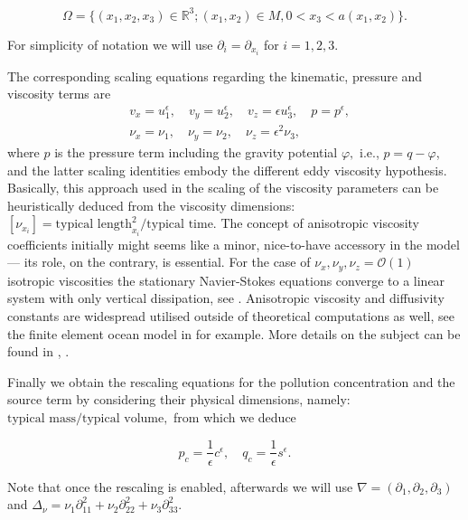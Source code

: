 \documentclass[12pt]{report}
\numberwithin{theorem}{chapter}
\numberwithin{corollary}{chapter}
\numberwithin{lemma}{chapter}
\numberwithin{remark}{chapter}
\numberwithin{definition}{chapter}
\numberwithin{prop}{chapter}
\begin{document}
\begin{equation} \Omega =  \{(x_1,x_2,x_3) \in \mathbb{R}^3 ; (x_1,x_2) \in M, 0 < x_3 < a (x_1 , x_2) \}.\end{equation}
    
For simplicity of notation we will use $\partial_i = \partial_{x_i} $ for $i = 1,2,3.$
    
The corresponding scaling equations regarding the kinematic, pressure and viscosity terms are
 \begin{equation}\label{scaling_eq_vpnu}
   \begin{split}
      &v_x = u_1^{\epsilon}, \quad v_y = u_2^{\epsilon}, \quad v_z = \epsilon u_3^{\epsilon}, \quad p = p^{\epsilon},\\
      &\nu_x = \nu_1, \quad \nu_y = \nu_2, \quad \nu_z = \epsilon^2 \nu_3,
  \end{split}
 \end{equation}
where $p$ is the pressure term including the gravity potential $\varphi,$ i.e., $p = q - \varphi$, and the latter scaling identities embody the different eddy viscosity hypothesis. Basically, this approach used in the scaling of the viscosity parameters can be heuristically deduced from the viscosity dimensions: $[\nu_{x_i}] = \text{typical length}_{x_i}^2 / \text{typical time}$. The concept of anisotropic viscosity coefficients initially might seems like a minor, nice-to-have accessory in the model --- its role, on the contrary, is essential. For the case of $\nu_x, \nu_y, \nu_z = \mathcal{O}(1)$ isotropic viscosities the stationary Navier-Stokes equations converge to a linear system with only vertical dissipation, see \cite{bresch1999vertical}. Anisotropic viscosity and diffusivity constants are widespread utilised outside of theoretical computations as well, see the finite element ocean model in \cite{danilov2002finite} for example.
More details on the subject can be found in \cite{azerad2001mathematical}, \cite{besson1992some}.

Finally we obtain the rescaling equations for the pollution concentration and the source term by considering their physical dimensions, namely: $\text{typical mass} / \text{typical volume},$ from which we deduce

\begin{equation}\label{scaling_eq_c}
  p_c = \frac{1}{\epsilon} c^\epsilon, \quad q_c = \frac{1}{\epsilon} s^\epsilon.
\end{equation}
    
Note that once the rescaling is enabled, afterwards we will use $\nabla = (\partial_1, \partial_2, \partial_3) $ and $ \Delta_\nu = \nu_1 \partial^2_{11} + \nu_2 \partial^2_{22}  + \nu_3 \partial^2_{33} $.
\end{document}
